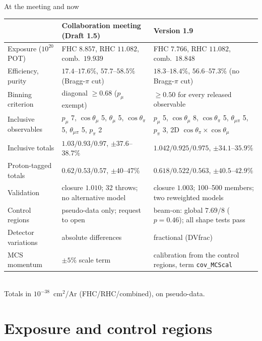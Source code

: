 \documentclass[aspectratio=169,10pt]{beamer}
\begin{document}
\begin{frame}{At the meeting and now}
  \footnotesize\setlength{\tabcolsep}{4pt}
  \begin{tabular}{lp{}p{}}
    \toprule
    & Collaboration meeting (Draft 1.5) & Version 1.9 \\
    \midrule
    Exposure ($10^{20}$ POT) & FHC $8.857$, RHC $11.082$, comb.\ $19.939$ & FHC $7.766$, RHC $11.082$, comb.\ $18.848$ \\
    Efficiency, purity & $17.4$--$17.6\%$, $57.7$--$58.5\%$ (Bragg-$\pi$ cut) & $18.3$--$18.4\%$, $56.6$--$57.3\%$ (no Bragg-$\pi$ cut) \\
    Binning criterion & diagonal $\geq0.68$ ($p_\mu$ exempt) & $\geq0.50$ for every released observable \\
    Inclusive observables & $p_\mu$ 7, $\cos\theta_\mu$ 5, $\theta_\mu$ 5, $\cos\theta_\pi$ 5, $\theta_{\mu\pi}$ 5, $p_\pi$ 2 &
      $p_\mu$ 5, $\cos\theta_\mu$ 8, $\cos\theta_\pi$ 5, $\theta_{\mu\pi}$ 5, $p_\pi$ 3, 2D $\cos\theta_\pi\times\cos\theta_\mu$ \\
    Inclusive totals & $1.03/0.93/0.97$, $\pm37.6$--$38.7\%$ & $1.042/0.925/0.975$, $\pm34.1$--$35.9\%$ \\
    Proton-tagged totals & $0.62/0.53/0.57$, $\pm40$--$47\%$ & $0.618/0.522/0.563$, $\pm40.5$--$42.9\%$ \\
    Validation & closure $1.010$; 32 throws; no alternative model & closure $1.003$; 100--500 members; two reweighted models \\
    Control regions & pseudo-data only; request to open & beam-on: global $7.69/8$ ($p=0.46$); all shape tests pass \\
    Detector variations & absolute differences & fractional (DVfrac) \\
    MCS momentum & $\pm5\%$ scale term & calibration from the control regions, term \texttt{cov\_MCScal} \\
    \bottomrule
  \end{tabular}\\[1mm]
  {\scriptsize Totals in $10^{-38}$~cm$^2$/Ar (FHC/RHC/combined), on pseudo-data.}
\end{frame}

\section{Exposure and control regions}
\end{document}
